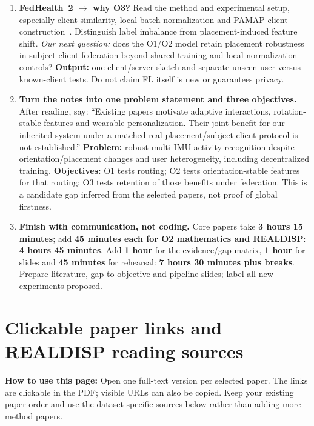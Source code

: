 \documentclass[10pt]{article}
\begin{document}
\begin{enumerate}[label=\textbf{\arabic*.},itemsep=5pt]
\item \textbf{FedHealth~2 $\rightarrow$ why O3?} Read the method and experimental setup, especially client similarity, local batch normalization and PAMAP client construction~\cite{omfedhealth}. Distinguish label imbalance from placement-induced feature shift. \emph{Our next question:} does the O1/O2 model retain placement robustness in subject-client federation beyond shared training and local-normalization controls? \textbf{Output:} one client/server sketch and separate unseen-user versus known-client tests. Do not claim FL itself is new or guarantees privacy.

\item \textbf{Turn the notes into one problem statement and three objectives.} After reading, say: ``Existing papers motivate adaptive interactions, rotation-stable features and wearable personalization. Their joint benefit for our inherited system under a matched real-placement/subject-client protocol is not established.'' \textbf{Problem:} robust multi-IMU activity recognition despite orientation/placement changes and user heterogeneity, including decentralized training. \textbf{Objectives:} O1 tests routing; O2 tests orientation-stable features for that routing; O3 tests retention of those benefits under federation. This is a candidate gap inferred from the selected papers, not proof of global firstness.

\item \textbf{Finish with communication, not coding.} Core papers take \textbf{3 hours 15 minutes}; add \textbf{45 minutes each for O2 mathematics and REALDISP}: \textbf{4 hours 45 minutes}. Add \textbf{1 hour} for the evidence/gap matrix, \textbf{1 hour} for slides and \textbf{45 minutes} for rehearsal: \textbf{7 hours 30 minutes plus breaks}. Prepare literature, gap-to-objective and pipeline slides; label all new experiments proposed.
\end{enumerate}

\clearpage
\section*{Clickable paper links and REALDISP reading sources}
\textbf{How to use this page:} Open one full-text version per selected paper. The links are clickable in the PDF; visible URLs can also be copied. Keep your existing paper order and use the dataset-specific sources below rather than adding more method papers.
\end{document}
